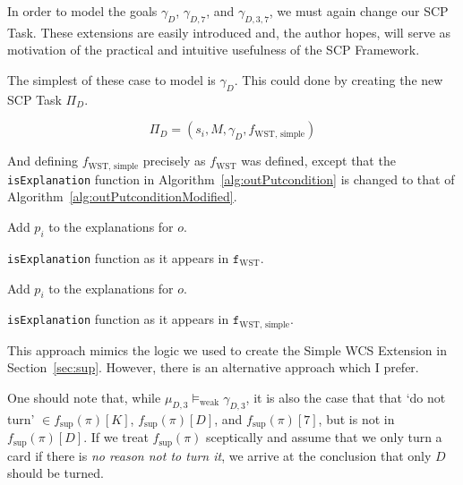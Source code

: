 
In order to model the goals $\gamma_{D}$, $\gamma_{D,7}$, and $\gamma_{D,3,7}$, we must again change our SCP Task. These extensions are easily introduced and, the author hopes, will serve as motivation of the practical and intuitive usefulness of the SCP Framework.

The simplest of these case to model is  $\gamma_{D}$. This could done by creating the new SCP Task $\Pi_D$.

\[
\Pi_D = (s_i, M, \gamma_D, f_\text{WST, simple})
\]

And defining $f_\text{WST, simple}$ precisely as $f_\text{WST}$ was defined, except that the \texttt{isExplanation} function in Algorithm~\ref{alg:outPutcondition} is changed to that of 
Algorithm~\ref{alg:outPutconditionModified}.

\begin{algorithm}[H] \label{alg:outPutcondition}
\SetAlgoLined
{}
{
{
Add $p_i$ to the explanations for $o$.
}
}
\caption{\texttt{isExplanation} function as it appears in $\texttt{f}_\text{WST}$.}
\end{algorithm}

\begin{algorithm}[H] \label{alg:outPutconditionModified}
\SetAlgoLined
{}
{
{
Add $p_i$ to the explanations for $o$.
}
}
\caption{\texttt{isExplanation} function as it appears in $\texttt{f}_\text{WST, simple}$.}
\end{algorithm}

This approach mimics the logic we used to create the Simple WCS Extension in Section~\ref{sec:sup}. However, there is an alternative approach which I prefer. 

One should note that, while $\mu_{D,3}\models_\text{weak} \gamma_{D,3}$, it is also the case that that `do not turn' $\in f_\text{sup}(\pi)[K]$, $f_\text{sup}(\pi)[D]$, and $ f_\text{sup}(\pi)[7]$, but is not in $ f_\text{sup}(\pi)[D]$. If we treat $f_\text{sup}(\pi)$ sceptically and assume that we only turn a card if there is \textit{no reason not to turn it}, we arrive at the conclusion that only $D$ should be turned.

